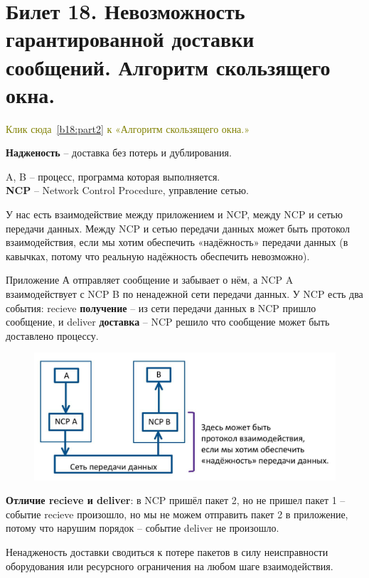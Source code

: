 \newpage
\section{Билет 18. Невозможность гарантированной доставки сообщений. Алгоритм скользящего окна.} \label{b18:part1}

\textcolor{olive}{Клик сюда~\ref{b18:part2} к «Алгоритм скользящего окна.»}

\textbf{Надженость} -- доставка без потерь и дублирования.

A, B -- процесс, программа которая выполняется.\\
\textbf{NCP} -- Network Control Procedure, управление сетью.

У нас есть взаимодействие между приложением и NCP, между NCP и сетью передачи данных.
Между NCP и сетью передачи данных может быть протокол взаимодействия, если мы хотим обеспечить «надёжность» передачи данных (в кавычках, потому что реальную надёжность обеспечить невозможно).

Приложение А отправляет сообщение и забывает о нём, а NCP A взаимодействует с NCP B по ненадежной сети передачи данных.
У NCP есть два события: recieve \textbf{получение} -- из сети передачи данных в NCP пришло сообщение, и deliver \textbf{доставка} -- NCP решило что сообщение может быть доставлено процессу.
\newline
\begin{figure}[H] \centering
	\includegraphics[scale = 0.4]{18/common.jpg}
\end{figure}

\textbf{Отличие recieve и deliver}: в NCP пришёл пакет 2, но не пришел пакет 1 -- событие recieve произошло, но мы не можем отправить пакет 2 в приложение, потому что нарушим порядок -- событие deliver не произошло.

Ненадженость доставки сводиться к потере пакетов в силу неисправности оборудования или ресурсного ограничения на любом шаге взаимодействия.
\bigskip

